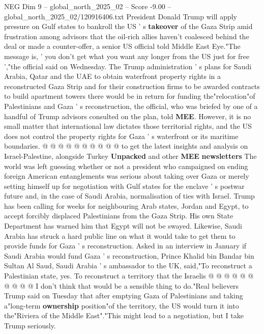 \begin{textsample}{NEG Dim 9 – global\_north\_2025\_02 – Score -9.00 – global\_north\_2025\_02/120916406.txt}  \label{ex:f9_neg_003}
President Donald Trump will apply pressure on Gulf states to bankroll the US ' s \textbf{takeover} of the Gaza Strip amid frustration among advisors that the oil-rich allies haven't coalesced behind the deal or made a counter-offer, a senior US official told Middle East Eye."The message is, ' you don't get what you want any longer from the US just for free ',"the official said on Wednesday.
The Trump administration ' s plans for Saudi Arabia, Qatar and the UAE to obtain waterfront property rights in a reconstructed Gaza Strip and for their construction firms to be awarded contracts to build apartment towers there would be in return for funding the"relocation"of Palestinians and Gaza ' s reconstruction, the official, who was briefed by one of a handful of Trump advisors consulted on the plan, told \textbf{MEE}.
However, it is no small matter that international law dictates those territorial rights, and the US does not control the property rights for Gaza ' s waterfront or its maritime boundaries. @ @ @ @ @ @ @ @ @ @ to get the latest insights and analysis on Israel-Palestine, alongside Turkey \textbf{Unpacked} and other \textbf{MEE} \textbf{newsletters} The world was left guessing whether or not a president who campaigned on ending foreign American entanglements was serious about taking over Gaza or merely setting himself up for negotiation with Gulf states for the enclave ' s postwar future and, in the case of Saudi Arabia, normalisation of ties with Israel.
Trump has been calling for weeks for neighbouring Arab states, Jordan and Egypt, to accept forcibly displaced Palestinians from the Gaza Strip.
His own State Department has warned him that Egypt will not be swayed.
Likewise, Saudi Arabia has struck a hard public line on what it would take to get them to provide funds for Gaza ' s reconstruction.
Asked in an interview in January if Saudi Arabia would fund Gaza ' s reconstruction, Prince Khalid bin Bandar bin Sultan Al Saud, Saudi Arabia ' s ambassador to the UK, said,"To reconstruct a Palestinian state, yes.
To reconstruct a territory that the Israelis @ @ @ @ @ @ @ @ @ @ I don't think that would be a sensible thing to do."Real believers Trump said on Tuesday that after emptying Gaza of Palestinians and taking a"long-term \textbf{ownership} position"of the territory, the US would turn it into the"Riviera of the Middle East"."This might lead to a negotiation, but I take Trump seriously.

\end{textsample}
